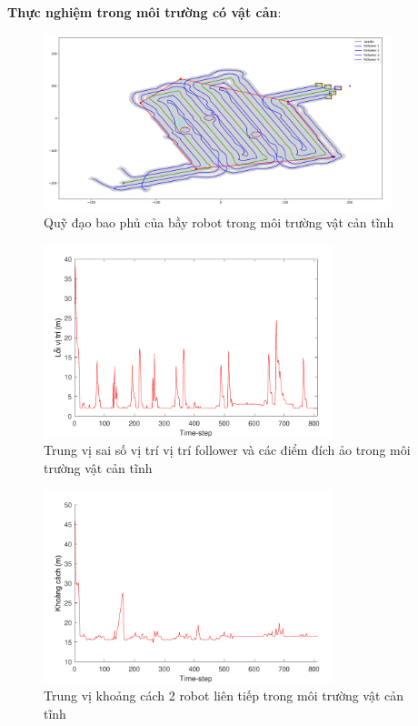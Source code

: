 \textbf{Thực nghiệm trong môi trường có vật cản}:

\begin{figure}[H]
    \centering
    \includegraphics[width=0.9\textwidth]{chapter5/image/rateobs.png}
    \caption{Quỹ đạo bao phủ của bầy robot trong môi trường vật cản tĩnh}
    \label{fig:rateobs}
\end{figure}

\begin{figure}[H]
    \centering
    \includegraphics[width=0.75\textwidth]{chapter5/image/Median_Err2.pdf}
    \caption{Trung vị sai số vị trí vị trí follower và các điểm đích ảo trong môi trường vật cản tĩnh}
    \label{fig:med_errpos}
\end{figure}

\begin{figure}[H]
    \centering
    \includegraphics[width=0.75\textwidth]{chapter5/image/Median_Dis2.pdf}
    \caption{Trung vị khoảng cách 2 robot liên tiếp trong môi trường vật cản tĩnh}
    \label{fig:med_errdis}
\end{figure}

